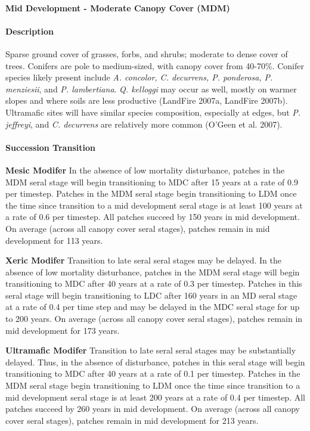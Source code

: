 \noindent\hrulefill

\paragraph{Mid Development - Moderate Canopy Cover (MDM)}

\paragraph{Description} Sparse ground cover of grasses, forbs, and shrubs; moderate to dense cover of trees. Conifers are pole to medium-sized, with canopy cover from 40-70\%. Conifer species likely present include \emph{A. concolor, C. decurrens, P. ponderosa, P. menziesii}, and \emph{P. lambertiana}. \emph{Q. kelloggi} may occur as well, mostly on warmer slopes and where soils are less productive (LandFire 2007a, LandFire 2007b). Ultramafic sites will have similar species composition, especially at edges, but \emph{P. jeffreyi}, and \emph{C. decurrens} are relatively more common (O’Geen et al. 2007).

\paragraph{Succession Transition}
\begin{adjustwidth}{2cm}{}
\textbf{Mesic Modifer } In the absence of low mortality disturbance, patches in the MDM seral stage will begin transitioning to MDC after 15 years at a rate of 0.9 per timestep. Patches in the MDM seral stage begin transitioning to LDM once the time since transition to a mid development seral stage is at least 100 years at a rate of 0.6 per timestep. All patches succeed by 150 years in mid development. On average (across all canopy cover seral stages), patches remain in mid development for 113 years.

\textbf{Xeric Modifer}  Transition to late seral seral stages may be delayed. In the absence of low mortality disturbance, patches in the MDM seral stage will begin transitioning to MDC after 40 years at a rate of 0.3 per timestep. Patches in this seral stage will begin transitioning to LDC after 160 years in an MD seral stage at a rate of 0.4 per time step and may be delayed in the MDC seral stage for up to 200 years. On average (across all canopy cover seral stages), patches remain in mid development for 173 years. 

\textbf{Ultramafic Modifer} Transition to late seral seral stages may be substantially delayed. Thus, in the absence of disturbance, patches in this seral stage will begin transitioning to MDC after 40 years at a rate of 0.1 per timestep. Patches in the MDM seral stage begin transitioning to LDM once the time since transition to a mid development seral stage is at least 200 years at a rate of 0.4 per timestep. All patches succeed by 260 years in mid development. On average (across all canopy cover seral stages), patches remain in mid development for 213 years.

\end{adjustwidth}

